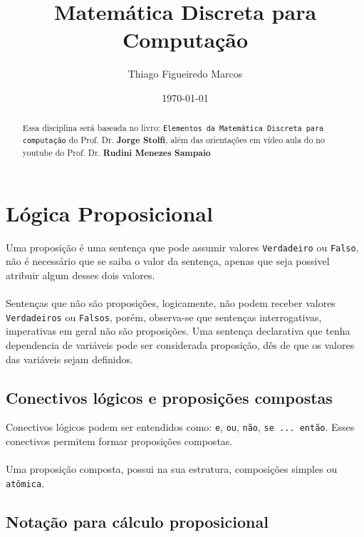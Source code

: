 \documentclass[12pt, onecolumn]{article}
\title{Matemática Discreta para Computação}
\author{Thiago Figueiredo Marcos}
\date{\today}
\begin{document}
	\maketitle
	
	\begin{abstract}
	Essa disciplina será baseada no livro: \texttt{Elementos da Matemática Discreta
		para computação} do Prof. Dr. \textbf{Jorge Stolfi},
		além das orientações em vídeo aula do no youtube do Prof. Dr. 
		\textbf{Rudini Menezes Sampaio}
	\end{abstract}

	\section{Lógica Proposicional}

	Uma proposição é uma sentença que pode assumir valores \texttt{Verdadeiro} 
	ou \texttt{Falso}, não é necessário que se saiba o valor da sentença, apenas
	que seja possivel atribuir algum desses dois valores.\\
	\\
	Sentenças que não são proposições, logicamente, não podem receber valores
	\texttt{Verdadeiros} ou \texttt{Falsos}, porém, observa-se que sentenças
	interrogativas, imperativas em geral não são proposições. Uma sentença 
	declarativa que tenha dependencia de variáveis pode ser considerada
	proposição, dês de que os valores das variáveis sejam definidos.
	
		\subsection{Conectivos lógicos e proposições compostas}

	Conectivos lógicos podem ser entendidos como: \texttt{e}, \texttt{ou}, 
	\texttt{não}, \texttt{se ... então}. Esses conectivos permitem formar 
	proposições compostas.\\
	\\
	Uma proposição composta, possui na sua estrutura, composições simples ou 
	\texttt{atômica}.

		\subsection{Notação para cálculo proposicional}
\end{document}
